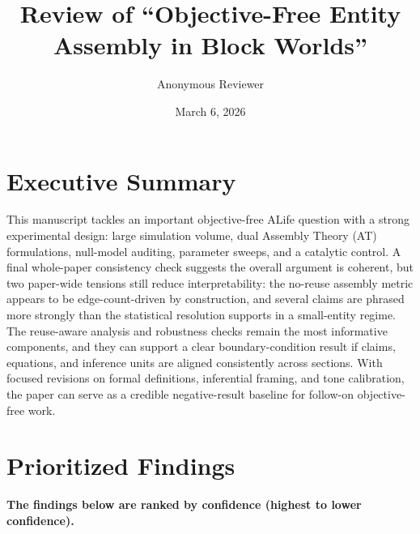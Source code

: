 \documentclass[11pt]{article}
\title{Review of ``Objective-Free Entity Assembly in Block Worlds''}
\author{Anonymous Reviewer}
\date{March 6, 2026}
\begin{document}
\maketitle

\section*{Executive Summary}
This manuscript tackles an important objective-free ALife question with a strong experimental design: large simulation volume, dual Assembly Theory (AT) formulations, null-model auditing, parameter sweeps, and a catalytic control. A final whole-paper consistency check suggests the overall argument is coherent, but two paper-wide tensions still reduce interpretability: the no-reuse assembly metric appears to be edge-count-driven by construction, and several claims are phrased more strongly than the statistical resolution supports in a small-entity regime. The reuse-aware analysis and robustness checks remain the most informative components, and they can support a clear boundary-condition result if claims, equations, and inference units are aligned consistently across sections. With focused revisions on formal definitions, inferential framing, and tone calibration, the paper can serve as a credible negative-result baseline for follow-on objective-free work.

\section*{Prioritized Findings}
\textbf{The findings below are ranked by confidence (highest to lower confidence).}
\end{document}
